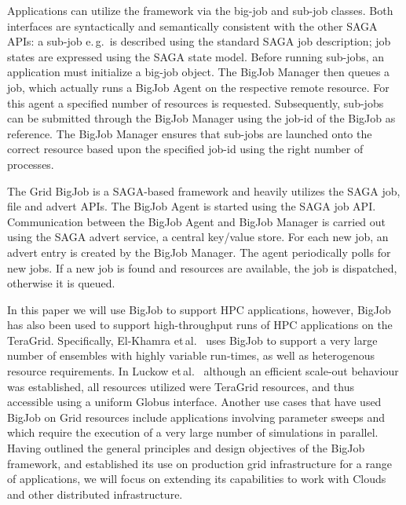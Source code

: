 \documentclass[conference,final]{IEEEtran}
\newcommand{\alnote}[1]{ {\textcolor{blue} { ***AL: #1 }}}
\newcommand{\jhanote}[1]{ {\textcolor{red} { ***SJ: #1 }}}
\newcommand{\alnote}[1]{}
\newcommand{\jhanote}[1]{}
\begin{document}
Applications can utilize the framework via the big-job and sub-job
classes. Both interfaces are syntactically and semantically consistent
with the other SAGA APIs: a sub-job e.\,g.\ is described using 
the standard SAGA job description; job states are expressed
using the SAGA state model. Before running sub-jobs, an application must initialize
a big-job object. The BigJob Manager then queues a job,
which actually runs a BigJob Agent on the respective remote
resource. For this agent a specified number of resources is
requested. Subsequently, sub-jobs can be submitted through the BigJob
Manager using the job-id of the BigJob as reference. The BigJob
Manager ensures that sub-jobs are launched onto the correct
resource based upon the specified job-id using the right number of
processes. 

The Grid BigJob is a SAGA-based framework and heavily utilizes the
SAGA job, file and advert APIs. The BigJob Agent is started using the
SAGA job API.  Communication between the BigJob Agent and BigJob
Manager is carried out using the SAGA advert service, a central
key/value store. For each new job, an advert entry is created by the
BigJob Manager. The agent periodically polls for new jobs. If a new
job is found and resources are available, the job is dispatched,
otherwise it is queued.


In this paper we will use BigJob to support HPC applications, however,
BigJob has also been used to support high-throughput runs of HPC
applications on the TeraGrid. Specifically, 
El-Khamra et\,al.~\cite{enkf-gmac09} uses BigJob to support a very
large number of ensembles with highly variable run-times, as well as
heterogenous resource requirements.  In Luckow et\,al.~\cite{repex_ptrs}
although an efficient scale-out behaviour was established, all resources
utilized were TeraGrid resources, and thus accessible using a uniform
Globus interface. Another use cases that have used BigJob on Grid
resources include applications involving parameter sweeps and which
require the execution of a very large number of simulations in
parallel.  Having outlined the general principles and design
objectives of the BigJob framework, and established its use on
production grid infrastructure for a range of applications, we will
focus on extending its capabilities to work with Clouds and other
distributed infrastructure.
\end{document}
